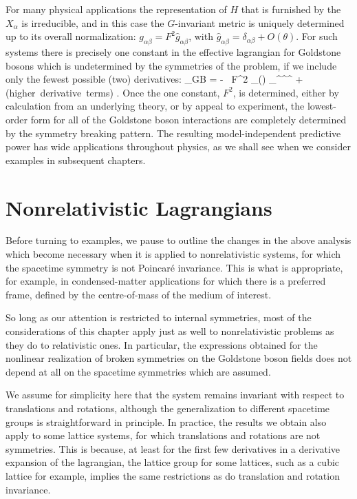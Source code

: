 \documentclass[12pt,epsf]{report}
\begin{document}
For many physical applications the representation of $H$
that is furnished by the $X_\alpha$ is irreducible, and in
this case the $G$-invariant metric is uniquely determined
up to its overall normalization: $g_{\alpha\beta} = F^2
\hat{g}_{\alpha\beta}$, with $\hat{g}_{\alpha\beta} =
\delta_{\alpha\beta} + O(\theta)$. For such systems there
is precisely one constant in the effective lagrangian for
Goldstone bosons which is undetermined by the symmetries of
the problem, if we include only the fewest possible (two) 
derivatives:
%
\eq
\label{genlowdterm}
\Scl_{\sss GB} = - \, {F^2 } \;
_{\alpha\beta}(\theta) \;
\partial_\mu \theta^\alpha \partial^\mu \theta^\beta 
+ \hbox{(higher derivative terms)} .
\eeq
%
Once the one constant, $F^2$, is determined, either by
calculation from an underlying theory, or by appeal to
experiment, the lowest-order form for all of the Goldstone
boson interactions are completely determined by the
symmetry breaking pattern. The resulting model-independent
predictive power has wide applications throughout physics,
as we shall see when we consider examples in subsequent
chapters.

\section{Nonrelativistic Lagrangians}

Before turning to examples, we pause to outline the changes
in the above analysis which become necessary when it is
applied to nonrelativistic systems, for which the spacetime
symmetry is not Poincar\'e invariance. This is what is
appropriate, for example, in condensed-matter applications
for which there is a preferred frame, defined by the
centre-of-mass of the medium of interest.

So long as our attention is restricted to internal
symmetries, most of the considerations of this chapter
apply just as well to nonrelativistic problems as they do
to relativistic ones. In particular, the expressions
obtained for the nonlinear realization of broken symmetries
on the Goldstone boson fields does not depend at all on the
spacetime symmetries which are assumed.

We assume for simplicity here that the system remains
invariant with respect to translations and rotations,
although the generalization to different spacetime groups
is straightforward in principle. In practice, the results
we obtain also apply to some lattice systems, for which
translations and rotations are not symmetries. This is
because, at least for the first few derivatives in a
derivative expansion of the lagrangian, the lattice group
for some lattices, such as a cubic lattice for example,
implies the same restrictions as do translation and
rotation invariance.
\end{document}
